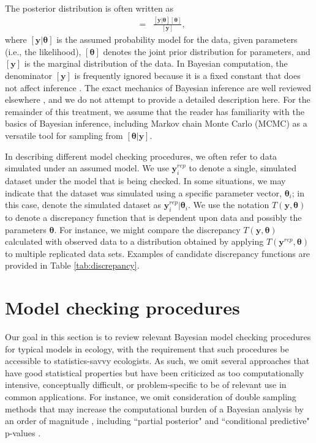 \documentclass[12pt,english]{article}
\begin{document}
\begin{spacing}{1.9}
The posterior distribution is often written as
\begin{eqnarray}
  [\boldsymbol{\theta} | \textbf{y}] & = & \frac{[\textbf{y} | \boldsymbol{\theta}] [\boldsymbol{\theta}]}{[\textbf{y}]},
\end{eqnarray}
where $[\textbf{y}|\boldsymbol{\theta}]$ is the assumed probability model for the data, given parameters (i.e., the likelihood), $[\boldsymbol{\theta}]$ denotes the joint prior distribution for parameters, and $[\textbf{y}]$ is the marginal distribution of the data.  In Bayesian computation, the denominator $[\textbf{y}]$ is frequently ignored because it is a fixed constant that does not affect inference \citep[although it is needed when computing Bayes factors for model comparison and averaging;][]{LinkBarker2006}.
The exact mechanics of Bayesian inference are well reviewed elsewhere \citep[e.g.,][]{KingEtAl2009,LinkBarker2010,HobbsHooten2015}, and we do not attempt to provide a detailed description here.  For the remainder of this treatment, we assume that the reader has familiarity with the basics of Bayesian inference, including Markov chain Monte Carlo (MCMC) as a versatile tool for sampling from $[\boldsymbol{\theta}|\textbf{y}]$.

In describing different model checking procedures, we often refer to data simulated under an assumed model.  We use $\textbf{y}_i^{rep}$ to denote a single, simulated dataset under the model that is being checked.  In some situations, we may indicate that the dataset was simulated using a specific parameter vector, $\boldsymbol{\theta}_i$; in this case, denote the simulated dataset as $\textbf{y}_i^{rep}|\boldsymbol{\theta}_i$.  We use the notation $T(\textbf{y},\boldsymbol{\theta})$ to denote a discrepancy function that is dependent upon data and possibly the parameters $\boldsymbol{\theta}$.  For instance, we might compare the  discrepancy $T(\textbf{y},\boldsymbol{\theta})$ calculated with observed data to a distribution obtained by applying $T(\textbf{y}^{rep},\boldsymbol{\theta})$ to multiple replicated data sets.  Examples of candidate discrepancy functions are provided in Table \ref{tab:discrepancy}.

\section{Model checking procedures}

Our goal in this section is to review relevant Bayesian model checking procedures for typical models in ecology, with the requirement that such procedures be accessible to statistics-savvy ecologists.  As such, we omit several approaches that have good statistical properties but have been criticized \citep[e.g.,][]{Johnson2007b,Zhang2014} as too computationally intensive, conceptually difficult, or problem-specific to be of relevant use in common applications.  For instance, we omit consideration of double sampling methods that may increase the computational burden of a Bayesian analysis by an order of magnitude \citep{Johnson2007b}, including  ``partial posterior" and ``conditional predictive" p-values \citep[see e.g.,][]{BayarriBerger1999,RobinsEtAl2000,BayarriCastellanos2007}.


\end{spacing}
\end{document}
